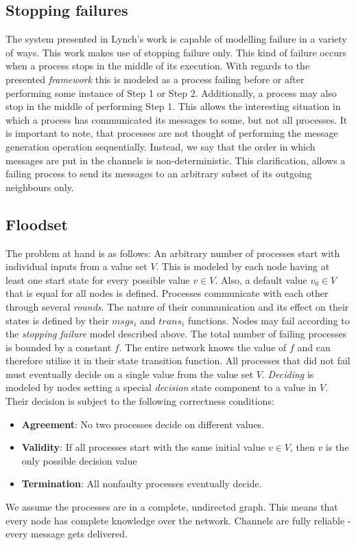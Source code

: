 \documentclass[fleqn]{article}
\begin{document}
\subsection{Stopping failures}
The system presented in Lynch's work \cite{refNancy} is capable of modelling failure in a variety of ways.
This work makes use of stopping failure only. This kind of failure occurs when a process stops in the middle of its execution. With regards to the presented \textit{framework} this
is modeled as a process failing before or after performing some instance of Step 1 or Step 2. Additionally, a process may also stop in the middle of performing Step 1. This allows
the interesting situation in which a process has communicated its messages to some, but not all processes. It is important to note, that processes are not thought of performing
the message generation operation sequentially. Instead, we say that the order in which messages are put in the channels is non-deterministic. This clarification, allows a failing process
to send its messages to an arbitrary subset of its outgoing neighbours only.


\subsection{Floodset}
The problem at hand is as follows: An arbitrary number of processes start with individual inputs from a value set $V$. This is modeled by each node having at least one start state
for every possible value $v \in V$. Also, a default value $v_0 \in V$ that is equal for all nodes is defined.
Processes communicate with each other through several \textit{rounds}. The nature of their communication and its effect on their states is defined by their $msgs_i$ and $trans_i$ functions.
Nodes may fail according to the \textit{stopping failure} model described above. The total number of failing processes is bounded by a constant $f$. The entire network knows the value of $f$ and
can therefore utilise it in their state transition function.
All processes that did not fail must eventually decide on a single value from the value set $V$. \textit{Deciding} is modeled by nodes setting a special \textit{decision} state component to a value in $V$.
Their decision is subject to the following correctness conditions:
\begin{itemize}
  \item \textbf{Agreement}: No two processes decide on different values.
  \item \textbf{Validity}: If all processes start with the same initial value $v \in V$, then $v$ is the only possible decision value
  \item \textbf{Termination}: All nonfaulty processes eventually decide.
\end{itemize}
We assume the processes are in a complete, undirected graph. This means that every node has complete knowledge over the network. Channels are fully reliable - every message gets delivered.
\end{document}
